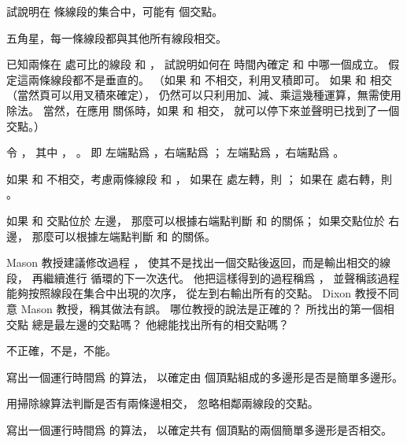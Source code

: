 \startsection[
  title={Determining whether any pair of segments intersects},
]

\startEXERCISE
試說明在  條線段的集合中，可能有  個交點。
\stopEXERCISE

\startANSWER
五角星，每一條線段都與其他所有線段相交。
\stopANSWER

\startEXERCISE[33.2-2]
已知兩條在  處可比的線段  和 ，
試說明如何在  時間內確定  和  中哪一個成立。
假定這兩條線段都不是垂直的。
（\hint 如果  和  不相交，利用叉積即可。
如果  和  相交（當然頁可以用叉積來確定），
仍然可以只利用加、減、乘這幾種運算，無需使用除法。
當然，在應用  關係時，如果  和  相交，
就可以停下來並聲明已找到了一個交點。）
\stopEXERCISE

\startANSWER
令 ，
其中 ，
 。
即  左端點爲 ，右端點爲 ；
  左端點爲 ，右端點爲 。

如果  和  不相交，考慮兩條線段  和 ，
如果在  處左轉，則 ；
如果在  處右轉，則 。

如果  和  交點位於  左邊，
那麼可以根據右端點判斷  和  的關係；
如果交點位於  右邊，
那麼可以根據左端點判斷  和  的關係。
\stopANSWER

\startEXERCISE
Mason 教授建議修改過程 ，
使其不是找出一個交點後返回，而是輸出相交的線段，
再繼續進行  循環的下一次迭代。
他把這樣得到的過程稱爲 ，
並聲稱該過程能夠按照線段在集合中出現的次序，
從左到右輸出所有的交點。
 Dixon 教授不同意 Mason 教授，稱其做法有誤。
哪位教授的說法是正確的？
  所找出的第一個相交點
總是最左邊的交點嗎？
他總能找出所有的相交點嗎？
\stopEXERCISE

\startANSWER
不正確，不是，不能。
\stopANSWER

\startEXERCISE
寫出一個運行時間爲  的算法，
以確定由  個頂點組成的多邊形是否是簡單多邊形。
\stopEXERCISE

\startANSWER
用掃除線算法判斷是否有兩條邊相交，
忽略相鄰兩線段的交點。
\stopANSWER

\startEXERCISE
寫出一個運行時間爲  的算法，
以確定共有  個頂點的兩個簡單多邊形是否相交。
\stopEXERCISE

